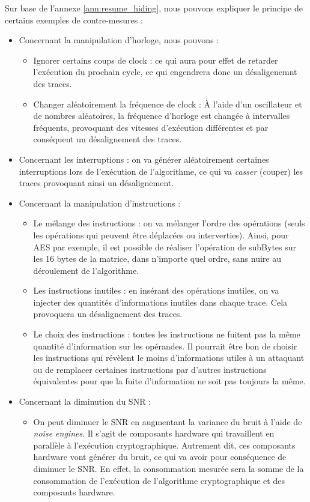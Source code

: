 \documentclass[10pt, oneside, a4paper]{article}
\begin{document}
\hspace{-0.5 cm}Sur base de l'annexe \ref{ann:resume_hiding}, nous pouvons expliquer le principe de certains exemples de contre-mesures :
\begin{itemize}
\item Concernant la manipulation d’horloge, nous pouvons :
\begin{itemize}
\item Ignorer certains coups de clock : ce qui aura pour effet de retarder l’exécution du prochain cycle, ce qui engendrera donc un désaligenemnt des traces.
\item Changer aléatoirement la fréquence de clock : À l’aide d’un oscillateur et de nombres aléatoires, la fréquence d’horloge est changée à intervalles fréquents, provoquant des vitesses d’exécution différentes et par conséquent un désalignement des traces.
\end{itemize}
\item Concernant les interruptions : on va générer aléatoirement certaines interruptions lors de l'exécution de l'algorithme, ce qui va \textit{casser} (couper) les traces provoquant ainsi un désalignement.
\item Concernant la manipulation d'instructions : 
\begin{itemize}
\item Le mélange des instructions : on va mélanger l’ordre des opérations (seuls les opérations qui peuvent être déplacées ou interverties). Ainsi, pour AES par exemple, il est possible de réaliser l’opération de subBytes sur les 16 bytes de la matrice, dans n’importe quel ordre, sans nuire au déroulement de l’algorithme.
\item Les instructions inutiles : en insérant des opérations inutiles, on va injecter des quantités d'informations inutiles dans chaque trace. Cela provoquera un désalignement des traces.
\item Le choix des instructions : toutes les instructions ne fuitent pas la même quantité d’information sur les opérandes. Il pourrait être bon de choisir les instructions qui révèlent le moins d’informations utiles à un attaquant ou de remplacer certaines instructions par d’autres instructions équivalentes pour que la fuite d’information ne soit pas toujours la même.
\end{itemize}
\item Concernant la diminution du SNR :
\begin{itemize}
\item On peut diminuer le SNR en augmentant la variance du bruit à l'aide de \textit{noise engines}. Il s'agit de composants hardware qui travaillent en parallèle à l’exécution cryptographique. Autrement dit, ces composants hardware vont générer du bruit, ce qui va avoir pour conséquence de diminuer le SNR. En effet, la consommation mesurée sera la somme de la consommation de l’exécution de l’algorithme cryptographique et des composants hardware.

\end{itemize}
\end{itemize}
\end{document}
